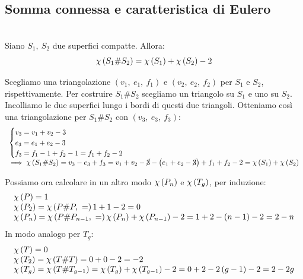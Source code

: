 \subsection{Somma connessa e caratteristica di Eulero}
\begin{lemming}~{}\\
	Siano $S_1,\ S_2$ due superfici compatte. Allora:
	\begin{equation}
		\euler{S_1\# S_2}{\ }=\euler{S_1}{\ }+\euler{S_2}{\ }-2
	\end{equation}
\vspace{-6mm}
\end{lemming}
\begin{demonstration}
	Scegliamo una triangolazione $\left(v_1,\ e_1,\ f_1\right)$ e $\left(v_2,\ e_2,\ f_2\right)$ per $S_1$ e $S_2$, rispettivamente. Per costruire $S_1\# S_2$ scegliamo un triangolo su $S_1$ e uno su $S_2$. Incolliamo le due superfici lungo i bordi di questi due triangoli. Otteniamo così una triangolazione per $S_1\# S_2$ con $\left(v_3,\ e_3,\ f_3\right)$:
	\begin{equation*}
		\begin{array}{l}
			\begin{cases}
				v_3=v_1+v_2-3\\
				e_3=e_1+e_2-3\\
				f_3=f_1-1+f_2-1=f_1+f_2-2
			\end{cases}\\
			\implies \euler{S_1\# S_2}{\ }=v_3-e_3+f_3=v_1+v_2-\cancel{3}-\left(e_1+e_2-\cancel{3}\right)+f_1+f_2-2=\euler{S_1}{\ }+\euler{S_2}{\ }
		\end{array}
	\end{equation*}
\end{demonstration}
\begin{observe}
	Possiamo ora calcolare in un altro modo $\euler{P_n}{\ }$ e $\euler{T_g}{\ }$, per induzione:
	\begin{equation*}
		\begin{array}{l}
			\euler{P}{\ }=1\\
			\euler{P_2}{\ }=\euler{P\# P}=1+1-2=0\\
			\euler{P_n}{\ }=\euler{P\# P_{n-1}}=\euler{P_n}{\ }+\euler{P_{n-1}}{\ }-2=1+2-\left(n-1\right)-2=2-n
		\end{array}
	\end{equation*}
In modo analogo per $T_g$:
\begin{equation*}
	\begin{array}{l}
		\euler{T}{\ }=0\\
		\euler{T_2}{\ }=\euler{T\# T}{\ }=0+0-2=-2\\
		\euler{T_g}{\ }=\euler{T\# T_{g-1}}{\ }=\euler{T_g}{\ }+\euler{T_{g-1}}{\ }-2=0+2-2\left(g-1\right)-2=2-2g
	\end{array}
\end{equation*}
\vspace{-3mm}
\end{observe}
